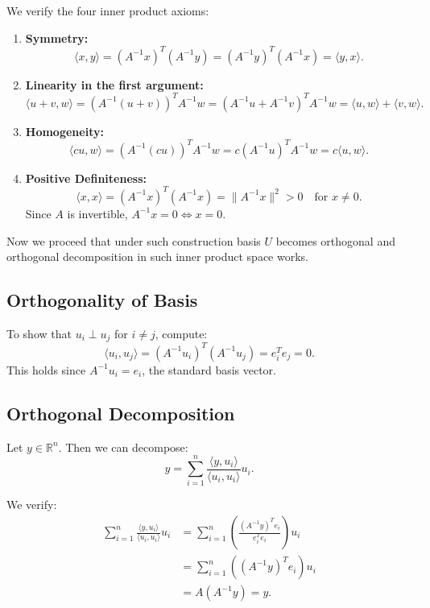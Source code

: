 \documentclass{article}
\begin{document}
We verify the four inner product axioms:

\begin{enumerate}
  \item \textbf{Symmetry:}
  \[
  \langle x, y \rangle = (A^{-1}x)^T (A^{-1}y) = (A^{-1}y)^T (A^{-1}x) = \langle y, x \rangle.
  \]

  \item \textbf{Linearity in the first argument:}
  \[
  \langle u+v, w \rangle = (A^{-1}(u+v))^T A^{-1}w = (A^{-1}u + A^{-1}v)^T A^{-1}w = \langle u, w \rangle + \langle v, w \rangle.
  \]

  \item \textbf{Homogeneity:}
  \[
  \langle cu, w \rangle = (A^{-1}(cu))^T A^{-1}w = c (A^{-1}u)^T A^{-1}w = c \langle u, w \rangle.
  \]

  \item \textbf{Positive Definiteness:}
  \[
  \langle x, x \rangle = (A^{-1}x)^T (A^{-1}x) = \|A^{-1}x\|^2 > 0 \quad \text{for } x \ne 0.
  \]
  Since \( A \) is invertible, \( A^{-1}x = 0 \iff x = 0 \).
\end{enumerate}

Now we proceed that under such construction basis $U$ becomes orthogonal and orthogonal decomposition in such inner product space works.

\subsection*{Orthogonality of Basis}

To show that \( u_i \perp u_j \) for \( i \ne j \), compute:
\[
\langle u_i, u_j \rangle = (A^{-1}u_i)^T (A^{-1}u_j) = e_i^T e_j = 0.
\]
This holds since \( A^{-1}u_i = e_i \), the standard basis vector.

\subsection*{Orthogonal Decomposition}

Let \( y \in \mathbb{R}^n \). Then we can decompose:
\[
y = \sum_{i=1}^n \frac{\langle y, u_i \rangle}{\langle u_i, u_i \rangle} u_i.
\]

We verify:
\begin{align*}
  \sum_{i=1}^n \frac{\langle y, u_i \rangle}{\langle u_i, u_i \rangle} u_i
  &= \sum_{i=1}^n \left( \frac{(A^{-1}y)^T e_i}{ e_i^T e_i} \right) u_i \\
  &= \sum_{i=1}^n ((A^{-1}y)^T e_i) u_i \\
  &= A (A^{-1} y) = y.
\end{align*}
\end{document}
